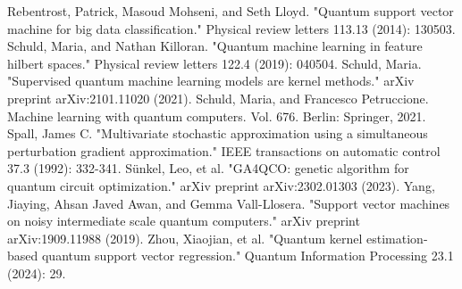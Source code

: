 \documentclass[12pt]{article}
\begin{document}
\begin{thebibliography}{9}
    Rebentrost, Patrick, Masoud Mohseni, and Seth Lloyd. "Quantum support vector machine for big data classification." Physical review letters 113.13 (2014): 130503.    
    Schuld, Maria, and Nathan Killoran. "Quantum machine learning in feature hilbert spaces." Physical review letters 122.4 (2019): 040504.    
    Schuld, Maria. "Supervised quantum machine learning models are kernel methods." arXiv preprint arXiv:2101.11020 (2021).    
    Schuld, Maria, and Francesco Petruccione. Machine learning with quantum computers. Vol. 676. Berlin: Springer, 2021.    
    Spall, James C. "Multivariate stochastic approximation using a simultaneous perturbation gradient approximation." IEEE transactions on automatic control 37.3 (1992): 332-341.    
    Sünkel, Leo, et al. "GA4QCO: genetic algorithm for quantum circuit optimization." arXiv preprint arXiv:2302.01303 (2023).    
    Yang, Jiaying, Ahsan Javed Awan, and Gemma Vall-Llosera. "Support vector machines on noisy intermediate scale quantum computers." arXiv preprint arXiv:1909.11988 (2019).    
    Zhou, Xiaojian, et al. "Quantum kernel estimation-based quantum support vector regression." Quantum Information Processing 23.1 (2024): 29.    




\end{thebibliography}
\end{document}
